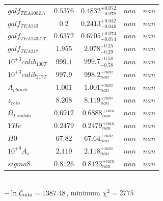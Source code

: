 \begin{tabular}{|l|c|c|c|c|}
$galf_{TE A 100 217 }$ &$0.5376$ & $0.4832_{-0.078}^{+0.072}$ & $nan$ & $nan$ \\ 
$galf_{TE A 143 }$ &$0.2$ & $0.2413_{-0.046}^{+0.042}$ & $nan$ & $nan$ \\ 
$galf_{TE A 143 217 }$ &$0.6372$ & $0.6705_{-0.074}^{+0.074}$ & $nan$ & $nan$ \\ 
$galf_{TE A 217 }$ &$1.955$ & $2.078_{-0.29}^{+0.25}$ & $nan$ & $nan$ \\ 
$10^{+3}calib_{100T }$ &$999.1$ & $999.7_{-0.58}^{+0.58}$ & $nan$ & $nan$ \\ 
$10^{+3}calib_{217T }$ &$997.9$ & $998.2_{nan}^{+nan}$ & $nan$ & $nan$ \\ 
$A_{planck }$ &$1.001$ & $1.001_{nan}^{+nan}$ & $nan$ & $nan$ \\ 
$z_{reio }$ &$8.208$ & $8.119_{nan}^{+nan}$ & $nan$ & $nan$ \\ 
$\Omega{}_{Lambda }$ &$0.6912$ & $0.6888_{nan}^{+nan}$ & $nan$ & $nan$ \\ 
$YHe$ &$0.2479$ & $0.2479_{nan}^{+nan}$ & $nan$ & $nan$ \\ 
$H0$ &$67.82$ & $67.64_{nan}^{+nan}$ & $nan$ & $nan$ \\ 
$10^{+9}A_{s }$ &$2.119$ & $2.118_{nan}^{+nan}$ & $nan$ & $nan$ \\ 
$sigma8$ &$0.8126$ & $0.8123_{nan}^{+nan}$ & $nan$ & $nan$ \\ 
\hline 
 \end{tabular} \\ 
$-\ln{\cal L}_\mathrm{min} =1387.48$, minimum $\chi^2=2775$ \\ 
